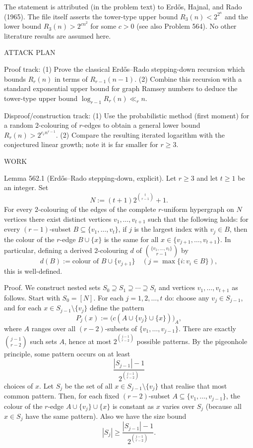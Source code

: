 The statement is attributed (in the problem text) to Erd\H{o}s, Hajnal, and Rado (1965). The file itself asserts the tower-type upper bound $R_3(n) < 2^{2^{n}}$ and the lower bound $R_3(n) > 2^{c n^2}$ for some $c>0$ (see also Problem 564). No other literature results are assumed here.

ATTACK PLAN

Proof track:
(1) Prove the classical Erd\H{o}s--Rado stepping-down recursion which bounds $R_r(n)$ in terms of $R_{r-1}(n-1)$.
(2) Combine this recursion with a standard exponential upper bound for graph Ramsey numbers to deduce the tower-type upper bound $\log_{r-1} R_r(n) \ll_r n$.

Disproof/construction track:
(1) Use the probabilistic method (first moment) for a random $2$-colouring of $r$-edges to obtain a general lower bound $R_r(n) > 2^{c_r n^{r-1}}$.
(2) Compare the resulting iterated logarithm with the conjectured linear growth; note it is far smaller for $r\ge 3$.

WORK

Lemma 562.1 (Erd\H{o}s--Rado stepping-down, explicit).
Let $r\ge 3$ and let $t\ge 1$ be an integer. Set
\[
N := (t+1) 2^{\binom{t}{r-1}} + 1.
\]
For every $2$-colouring of the edges of the complete $r$-uniform hypergraph on $N$ vertices there exist distinct vertices
$v_1,\dots,v_{t+1}$ such that the following holds:
for every $(r-1)$-subset $B\subseteq\{v_1,\dots,v_t\}$, if $j$ is the largest index with $v_j\in B$, then the colour of the $r$-edge
$B\cup\{x\}$ is the same for all $x\in\{v_{j+1},\dots,v_{t+1}\}$.
In particular, defining a derived $2$-colouring $d$ of $\binom{\{v_1,\dots,v_t\}}{r-1}$ by
\[
d(B) := \text{colour of } B\cup\{v_{j+1}\} \quad (j=\max\{i: v_i\in B\}),
\]
this is well-defined.

Proof.
We construct nested sets $S_0\supseteq S_1\supseteq\cdots\supseteq S_t$ and vertices $v_1,\dots,v_{t+1}$ as follows.
Start with $S_0=[N]$.
For each $j=1,2,\dots,t$ do:
choose any $v_j\in S_{j-1}$, and for each $x\in S_{j-1}\setminus\{v_j\}$ define the pattern
\[
P_j(x) := \bigl( c(A\cup\{v_j\}\cup\{x\}) \bigr)_{A},
\]
where $A$ ranges over all $(r-2)$-subsets of $\{v_1,\dots,v_{j-1}\}$. There are exactly $\binom{j-1}{r-2}$ such sets $A$, hence at most
$2^{\binom{j-1}{r-2}}$ possible patterns.
By the pigeonhole principle, some pattern occurs on at least
\[
\frac{|S_{j-1}|-1}{2^{\binom{j-1}{r-2}}}
\]
choices of $x$. Let $S_j$ be the set of all $x\in S_{j-1}\setminus\{v_j\}$ that realise that most common pattern.
Then, for each fixed $(r-2)$-subset $A\subseteq\{v_1,\dots,v_{j-1}\}$, the colour of the $r$-edge $A\cup\{v_j\}\cup\{x\}$ is
constant as $x$ varies over $S_j$ (because all $x\in S_j$ have the same pattern).
Also we have the size bound
\[
|S_j| \ge \frac{|S_{j-1}|-1}{2^{\binom{j-1}{r-2}}}.
\]

